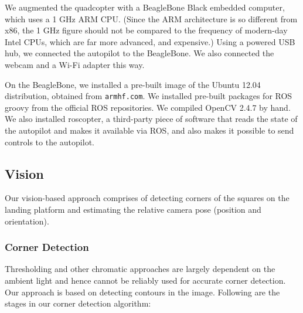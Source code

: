 \documentclass[10pt]{scrartcl} %
\begin{document}
We augmented the quadcopter with a BeagleBone Black embedded computer, which
uses a 1 GHz ARM CPU. (Since the ARM architecture is so different from x86,
the 1 GHz figure should not be compared to the frequency of modern-day Intel
CPUs, which are far more advanced, and expensive.) Using a powered USB hub, we
connected the autopilot to the BeagleBone. We also connected the webcam and a
Wi-Fi adapter this way.


On the BeagleBone, we installed a pre-built image of the Ubuntu 12.04
distribution, obtained from {\tt armhf.com}. We installed pre-built packages
for ROS groovy from the official ROS repositories. We compiled OpenCV 2.4.7 by
hand. We also installed roscopter, a third-party piece of software that reads
the state of the autopilot and makes it available via ROS, and also makes it
possible to send controls to the autopilot.


\subsection{Vision}
Our vision-based approach comprises of detecting corners of the squares on the 
landing platform and estimating the relative camera pose (position and orientation).

\subsubsection{Corner Detection}
Thresholding and other chromatic approaches are largely dependent on the ambient light
and hence cannot be reliably used for accurate corner detection. Our approach is based
on detecting contours in the image. Following are the stages in our corner detection 
algorithm:
\end{document}
